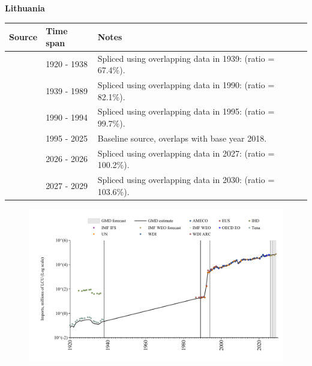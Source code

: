 \documentclass[12pt,a4paper,landscape]{article}
\begin{document}
\begin{adjustbox}{max totalsize={\paperwidth}{\paperheight},center}
\begin{minipage}[t][\textheight][t]{\textwidth}
\vspace*{0.5cm}
{}
\begin{center}
{\Large\bfseries Lithuania}
\end{center}
\vspace{0.5cm}
\begin{table}[H]
\centering
\small
\begin{tabular}{|l|l|l|}
\hline
\textbf{Source} & \textbf{Time span} & \textbf{Notes} \\
\hline
\rowcolor{white}\cite{Tena}& 1920 - 1938 &Spliced using overlapping data in 1939: (ratio = 67.4\%).\\
\rowcolor{lightgray}\cite{WDI_ARC}& 1939 - 1989 &Spliced using overlapping data in 1990: (ratio = 82.1\%).\\
\rowcolor{white}\cite{AMECO}& 1990 - 1994 &Spliced using overlapping data in 1995: (ratio = 99.7\%).\\
\rowcolor{lightgray}\cite{OECD_EO}& 1995 - 2025 &Baseline source, overlaps with base year 2018.\\
\rowcolor{white}\cite{AMECO}& 2026 - 2026 &Spliced using overlapping data in 2027: (ratio = 100.2\%).\\
\rowcolor{lightgray}\cite{IMF_WEO_forecast}& 2027 - 2029 &Spliced using overlapping data in 2030: (ratio = 103.6\%).\\
\hline
\end{tabular}
\end{table}
\begin{figure}[H]
\centering
\includegraphics[width=\textwidth,height=0.6\textheight,keepaspectratio]{graphs/LTU_imports.pdf}
\end{figure}
\end{minipage}
\end{adjustbox}
\end{document}
